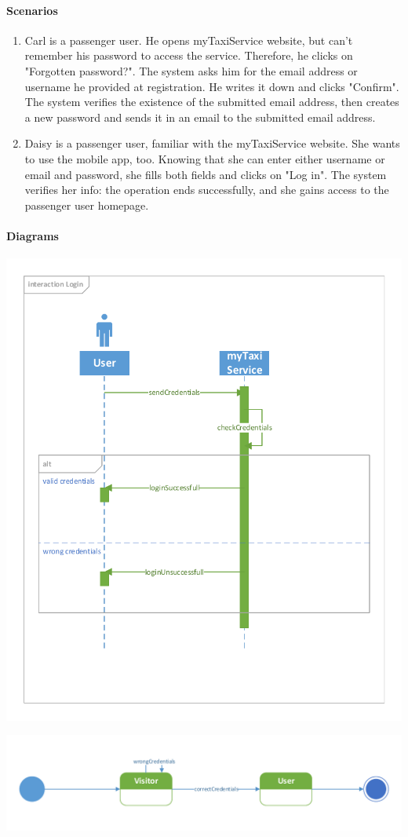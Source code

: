 \paragraph{Scenarios}
\begin{enumerate}
	\item Carl is a passenger user. He opens myTaxiService website, but can't remember his password to access the service. Therefore, he clicks on "Forgotten password?". The system asks him for the email address or username he provided at registration. He writes it down and clicks "Confirm". The system verifies the existence of the submitted email address, then creates a new password and sends it in an email to the submitted email address.
	
	\item Daisy is a passenger user, familiar with the myTaxiService website. She wants to use the mobile app, too. Knowing that she can enter either username or email and password, she fills both fields and clicks on "Log in". The system verifies her info: the operation ends successfully, and she gains access to the passenger user homepage.
\end{enumerate}

\paragraph{Diagrams}
\begin{center}
	\includegraphics[height=\textwidth]{diagrams/login}
\end{center}
\begin{center}
	\includegraphics[width=\textwidth]{diagrams/login_state}
\end{center}
